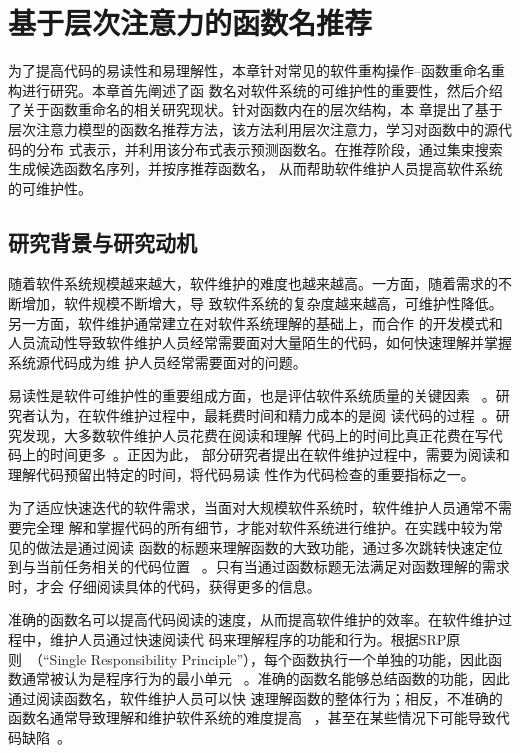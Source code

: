 
\chapter{基于层次注意力的函数名推荐}
为了提高代码的易读性和易理解性，本章针对常见的软件重构操作--函数重命名重构进行研究。本章首先阐述了函
数名对软件系统的可维护性的重要性，然后介绍了关于函数重命名的相关研究现状。针对函数内在的层次结构，本
章提出了基于层次注意力模型的函数名推荐方法，该方法利用层次注意力，学习对函数中的源代码的分布
式表示，并利用该分布式表示预测函数名。在推荐阶段，通过集束搜索生成候选函数名序列，并按序推荐函数名，
从而帮助软件维护人员提高软件系统的可维护性。

\section{研究背景与研究动机}
随着软件系统规模越来越大，软件维护的难度也越来越高。一方面，随着需求的不断增加，软件规模不断增大，导
致软件系统的复杂度越来越高，可维护性降低。另一方面，软件维护通常建立在对软件系统理解的基础上，而合作
的开发模式和人员流动性导致软件维护人员经常需要面对大量陌生的代码，如何快速理解并掌握系统源代码成为维
护人员经常需要面对的问题。

易读性是软件可维护性的重要组成方面，也是评估软件系统质量的关键因素
~\cite{buse2008metric}。研究者认为，在软件维护过程中，最耗费时间和精力成本的是阅
读代码的过程~\cite{rugaber2000use}。研究发现，大多数软件维护人员花费在阅读和理解
代码上的时间比真正花费在写代码上的时间更多~\cite{ko2006exploratory}。正因为此，
部分研究者提出在软件维护过程中，需要为阅读和理解代码预留出特定的时间，将代码易读
性作为代码检查的重要指标之一。

为了适应快速迭代的软件需求，当面对大规模软件系统时，软件维护人员通常不需要完全理
解和掌握代码的所有细节，才能对软件系统进行维护。在实践中较为常见的做法是通过阅读
函数的标题来理解函数的大致功能，通过多次跳转快速定位到与当前任务相关的代码位置
~\cite{starke2009searching}。只有当通过函数标题无法满足对函数理解的需求时，才会
仔细阅读具体的代码，获得更多的信息。

准确的函数名可以提高代码阅读的速度，从而提高软件维护的效率。在软件维护过程中，维护人员通过快速阅读代
码来理解程序的功能和行为。根据SRP原则~\cite{martin2003agile}（``Single Responsibility
Principle''），每个函数执行一个单独的功能，因此函数通常被认为是程序行为的最小单元
~\cite{host2009debugging}。准确的函数名能够总结函数的功能，因此通过阅读函数名，软件维护人员可以快
速理解函数的整体行为；相反，不准确的函数名通常导致理解和维护软件系统的难度提高
~\cite{arnaoudova2016linguistic}，甚至在某些情况下可能导致代码缺陷~\cite{abebe2012can}。

